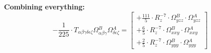 \documentclass{article}
\begin{document}
\textbf{Combining everything:}
\begin{equation}
- \frac{1}{225} \cdot T_{\alpha{}\beta{}\gamma{}\delta{}\epsilon{}\zeta{}} \Omega{}^{B}_{\alpha{}\beta{}\gamma{}} \Omega{}^{A}_{\delta{}\epsilon{}\zeta{}} =  \left[ \begin{array}{c} 
 		+ \frac{111}{5} \cdot R_{z}^{-7} \cdot \Omega{}^{B}_{yzz} \cdot \Omega{}^{A}_{yzz} 
 \\[0.2em] 		 + \frac{6}{5} \cdot R_{z}^{-7} \cdot \Omega{}^{B}_{xxy} \cdot \Omega{}^{A}_{xxy} 
 \\[0.2em] 		 + \frac{2}{5} \cdot R_{z}^{-7} \cdot \Omega{}^{B}_{yyy} \cdot \Omega{}^{A}_{yyy}
 \end{array}\right] 
\end{equation}
\end{document}
